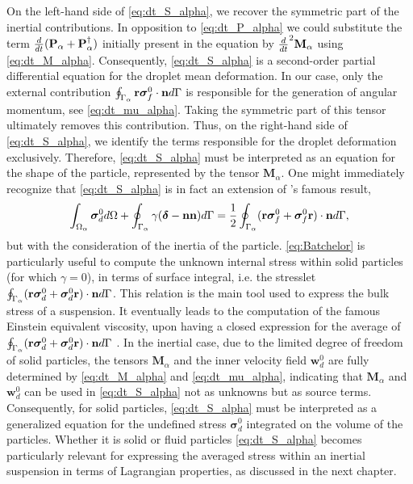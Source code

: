 On the left-hand side of \ref{eq:dt_S_alpha}, we recover the symmetric part of the inertial contributions. 
In opposition to \ref{eq:dt_P_alpha} we could substitute the term $\frac{d}{dt} (\textbf{P}_\alpha+\textbf{P}_\alpha^\dagger)$ initially present in the equation by $\frac{d}{dt}^2 \textbf{M}_\alpha$ using \ref{eq:dt_M_alpha}. 
Consequently, \ref{eq:dt_S_alpha} is a second-order partial differential equation for the droplet mean deformation. 
In our case, only the external contribution $\oint_{\Gamma_{\alpha}} \textbf{r}\bm\sigma_f^0\cdot \textbf{n} d\Gamma$ is responsible for the generation of angular momentum, see \ref{eq:dt_mu_alpha}.
Taking the symmetric part of this tensor ultimately removes this contribution. 
Thus, on the right-hand side of \ref{eq:dt_S_alpha}, we identify the terms responsible for the droplet deformation exclusively.
Therefore, \ref{eq:dt_S_alpha} must be interpreted as an equation for the shape of the particle, represented by the tensor $\textbf{M}_\alpha$.
One might immediately recognize that \ref{eq:dt_S_alpha} is in fact an extension of \citet{batchelor1970stress}'s famous result, 
\begin{equation}
    \intO{\bm{\sigma}_d^0}
    + \intS{\gamma(\bm\delta - \textbf{nn})}
    = \frac{1}{2}\intS{(\textbf{r}\bm\sigma_f^0+\bm\sigma_f^0\textbf{r})\cdot \textbf{n}},
    \label{eq:Batchelor}
\end{equation}
but with the consideration of the inertia of the particle.
\ref{eq:Batchelor} is particularly useful to compute the unknown internal stress within solid particles (for which $\gamma = 0$), in terms of surface integral, i.e. the stresslet $\oint_{\Gamma_{\alpha}} (\textbf{r}\bm\sigma_d^0+ \bm\sigma_d^0\textbf{r})\cdot \textbf{n} d\Gamma$.
This relation is the main tool used to express the bulk stress of a suspension.
It eventually leads to the computation of the famous Einstein equivalent viscosity, upon having a closed expression for the average of $\oint_{\Gamma_{\alpha}} (\textbf{r}\bm\sigma_d^0+ \bm\sigma_d^0\textbf{r})\cdot \textbf{n} d\Gamma$ \citep{guazzelli2011}. 
In the inertial case, due to the limited degree of freedom of solid particles, the tensors $\textbf{M}_\alpha$ and the inner velocity field $\textbf{w}_d^0$ are fully determined by \ref{eq:dt_M_alpha} and \ref{eq:dt_mu_alpha}, indicating that $\textbf{M}_\alpha$ and $\textbf{w}_d^0$ can be used in \ref{eq:dt_S_alpha} not as unknowns but as source terms. 
Consequently, for solid particles, \ref{eq:dt_S_alpha} must be interpreted as a generalized equation for the undefined stress $\bm\sigma_d^0$ integrated on the volume of the particles.
Whether it is solid or fluid particles \ref{eq:dt_S_alpha} becomes particularly relevant for expressing the averaged stress within an inertial suspension in terms of Lagrangian properties, as discussed in the next chapter. 

